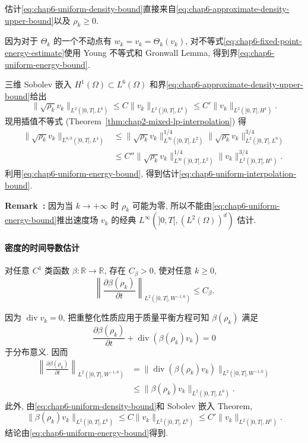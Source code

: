 \begin{sloppypar}
\begin{Proof}
估计\eqref{eq:chap6-uniform-density-bound}直接来自\eqref{eq:chap6-approximate-density-upper-bound}以及 $\rho_k\geq0$.

因为对于 $\Theta_k$ 的一个不动点有 $w_k=v_k=\Theta_k(v_k)$, 对不等式\eqref{eq:chap6-fixed-point-energy-estimate}使用 Young 不等式和 Gronwall Lemma, 得到界\eqref{eq:chap6-uniform-energy-bound}.

三维 Sobolev 嵌入 $H^1(\Omega)\subset L^6(\Omega)$ 和界\eqref{eq:chap6-approximate-density-upper-bound}给出
\[
 \|\sqrt{\rho_k}v_k\|_{L^2(]0,T[,L^6)}
 \leq C\|v_k\|_{L^2(]0,T[,L^6)}
 \leq C'\|v_k\|_{L^2(]0,T[,H^1)}.
\]
现用插值不等式 (Theorem~\ref{thm:chap2-mixed-lp-interpolation}) 得
\[
\begin{aligned}
 \|\sqrt{\rho_k}v_k\|_{L^{8/3}(]0,T[,L^4)}
 &\leq\|\sqrt{\rho_k}v_k\|_{L^\infty(]0,T[,L^2)}^{1/4}
 \|\sqrt{\rho_k}v_k\|_{L^2(]0,T[,L^6)}^{3/4}\\
 &\leq C''\|\sqrt{\rho_k}v_k\|_{L^\infty(]0,T[,L^2)}^{1/4}
 \|v_k\|_{L^2(]0,T[,H^1)}^{3/4}.
\end{aligned}
\]
利用\eqref{eq:chap6-uniform-energy-bound}, 得到估计\eqref{eq:chap6-uniform-interpolation-bound}.
\end{Proof}

\par\noindent{}\textbf{Remark~\thechaptersixsectiontworemark:}\label{rem:chap6-vacuum-no-velocity-linfty-bound}
因为当 $k\to+\infty$ 时 $\rho_k$ 可能为零, 所以不能由\eqref{eq:chap6-uniform-energy-bound}推出速度场 $v_k$ 的经典 $L^\infty(]0,T[,(L^2(\Omega))^d)$ 估计.

\paragraph{密度的时间导数估计}
\label{subsec:chap6-density-time-derivative-estimate}

\begin{Lemma}
\label{lem:chap6-density-time-derivative}
对任意 $C^1$ 类函数 $\beta:\mathbb R\to\mathbb R$, 存在 $C_\beta>0$, 使对任意 $k\geq0$,
\[
 \left\|\frac{\partial\beta(\rho_k)}{\partial t}\right\|_{L^2(]0,T[,W^{-1,6})}
 \leq C_\beta.
\]
\end{Lemma}

\begin{Proof}
因为 $\operatorname{div}v_k=0$, 把重整化性质应用于质量平衡方程可知 $\beta(\rho_k)$ 满足
\[
 \frac{\partial\beta(\rho_k)}{\partial t}
 +\operatorname{div}(\beta(\rho_k)v_k)=0
\]
于分布意义. 因而
\[
\begin{aligned}
 \left\|\frac{\partial\beta(\rho_k)}{\partial t}\right\|_{L^2(]0,T[,W^{-1,6})}
 &=\|\operatorname{div}(\beta(\rho_k)v_k)\|_{L^2(]0,T[,W^{-1,6})}\\
 &\leq\|\beta(\rho_k)v_k\|_{L^2(]0,T[,L^6)}.
\end{aligned}
\]
此外, 由\eqref{eq:chap6-uniform-density-bound}和 Sobolev 嵌入 Theorem,
\[
 \|\beta(\rho_k)v_k\|_{L^2(]0,T[,L^6)}
 \leq C\|v_k\|_{L^2(]0,T[,L^6)}
 \leq C'\|v_k\|_{L^2(]0,T[,H^1)}.
\]
结论由\eqref{eq:chap6-uniform-energy-bound}得到.
\end{Proof}


\end{sloppypar}
